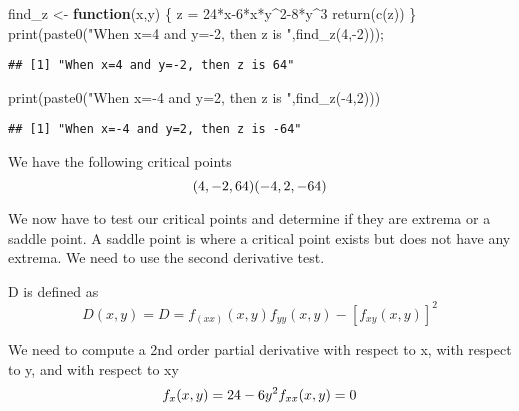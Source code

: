 \documentclass[
]{article}
\newenvironment{Shaded}{\begin{snugshade}}{\end{snugshade}}
\newcommand{\ControlFlowTok}[1]{\textcolor[rgb]{0.13,0.29,0.53}{\textbf{#1}}}
\newcommand{\DecValTok}[1]{\textcolor[rgb]{0.00,0.00,0.81}{#1}}
\newcommand{\FunctionTok}[1]{\textcolor[rgb]{0.00,0.00,0.00}{#1}}
\newcommand{\NormalTok}[1]{#1}
\newcommand{\OtherTok}[1]{\textcolor[rgb]{0.56,0.35,0.01}{#1}}
\newcommand{\SpecialCharTok}[1]{\textcolor[rgb]{0.00,0.00,0.00}{#1}}
\newcommand{\StringTok}[1]{\textcolor[rgb]{0.31,0.60,0.02}{#1}}
\begin{document}
\begin{Shaded}
\begin{Highlighting}[]
\NormalTok{find\_z }\OtherTok{\textless{}{-}} \ControlFlowTok{function}\NormalTok{(x,y)}
\NormalTok{  \{}
\NormalTok{   z }\OtherTok{=} \DecValTok{24}\SpecialCharTok{*}\NormalTok{x}\DecValTok{{-}6}\SpecialCharTok{*}\NormalTok{x}\SpecialCharTok{*}\NormalTok{y}\SpecialCharTok{\^{}}\DecValTok{2{-}8}\SpecialCharTok{*}\NormalTok{y}\SpecialCharTok{\^{}}\DecValTok{3}
   \FunctionTok{return}\NormalTok{(}\FunctionTok{c}\NormalTok{(z))}
\NormalTok{\}}
\FunctionTok{print}\NormalTok{(}\FunctionTok{paste0}\NormalTok{(}\StringTok{"When x=4 and y={-}2, then z is "}\NormalTok{,}\FunctionTok{find\_z}\NormalTok{(}\DecValTok{4}\NormalTok{,}\SpecialCharTok{{-}}\DecValTok{2}\NormalTok{)));}
\end{Highlighting}
\end{Shaded}

\begin{verbatim}
## [1] "When x=4 and y=-2, then z is 64"
\end{verbatim}

\begin{Shaded}
\begin{Highlighting}[]
\FunctionTok{print}\NormalTok{(}\FunctionTok{paste0}\NormalTok{(}\StringTok{"When x={-}4 and y=2, then z is "}\NormalTok{,}\FunctionTok{find\_z}\NormalTok{(}\SpecialCharTok{{-}}\DecValTok{4}\NormalTok{,}\DecValTok{2}\NormalTok{)))}
\end{Highlighting}
\end{Shaded}

\begin{verbatim}
## [1] "When x=-4 and y=2, then z is -64"
\end{verbatim}

We have the following critical points \[
(4, -2, 64)\\
(-4, 2, -64)
\]

We now have to test our critical points and determine if they are
extrema or a saddle point. A saddle point is where a critical point
exists but does not have any extrema. We need to use the second
derivative test.

D is defined as \[
D(x,y)=D=f_(xx)(x,y)f_{yy}(x,y)-[f_{xy}(x, y)]^{2}
\]

We need to compute a 2nd order partial derivative with respect to x,
with respect to y, and with respect to xy \[
f_{x}(x, y)=24-6y^{2}\\
f_{xx}(x, y)=0
\]
\end{document}
